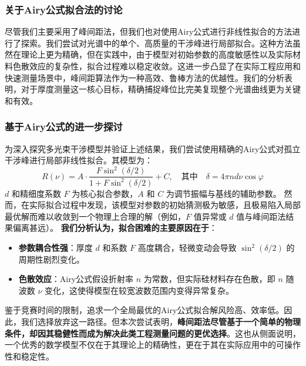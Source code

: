 \documentclass{ctexart} %
\begin{document}
\subsubsection{关于Airy公式拟合法的讨论}
尽管我们主要采用了峰间距法，但我们也对使用Airy公式进行非线性拟合的方法进行了探索。我们尝试对光谱中的单个、高质量的干涉峰进行局部拟合。这种方法虽然在理论上更为精确，但在实践中，由于模型对初始参数的高度敏感性以及实际材料色散效应的复杂性，拟合过程难以稳定收敛。这进一步凸显了在实际工程应用和快速测量场景中，峰间距算法作为一种高效、鲁棒方法的优越性。我们的分析表明，对于厚度测量这一核心目标，精确捕捉峰位比完美复现整个光谱曲线更为关键和有效。

\subsubsection{基于Airy公式的进一步探讨}
为深入探究多光束干涉模型并验证上述结果，我们尝试使用精确的Airy公式对孤立干涉峰进行局部非线性拟合。其模型为：
$$
    R(\nu) = A \cdot \frac{F \sin^2(\delta/2)}{1 + F \sin^2(\delta/2)} + C, \quad \text{其中} \quad \delta = 4\pi n d \nu \cos\varphi
$$
$d$ 和精细度系数 $F$ 为核心拟合参数，$A$ 和 $C$ 为调节振幅与基线的辅助参数。
然而，在实际拟合过程中发现，该模型对参数的初始猜测极为敏感，且极易陷入局部最优解而难以收敛到一个物理上合理的解（例如，$F$ 值异常或 $d$ 值与峰间距法结果偏离甚远）。
\textbf{我们分析认为，拟合困难的主要原因在于}：
\begin{itemize}
    \item \textbf{参数耦合性强}：厚度 $d$ 和系数 $F$ 高度耦合，轻微变动会导致 $\sin^2(\delta/2)$ 的周期性剧烈变化。
    \item \textbf{色散效应}：Airy公式假设折射率 $n$ 为常数，但实际硅材料存在色散，即 $n$ 随波数 $\nu$ 变化，这使得模型在较宽波数范围内变得异常复杂。
\end{itemize}
鉴于竞赛时间的限制，追求一个全局最优的Airy公式拟合解风险高、效率低。因此，我们选择放弃这一路径。但本次尝试表明，\textbf{峰间距法尽管基于一个简单的物理条件，却因其稳健性而成为解决此类工程测量问题的更优选择}。这也从侧面说明，一个优秀的数学模型不仅在于其理论上的精确性，更在于其在实际应用中的可操作性和稳定性。
\end{document}

